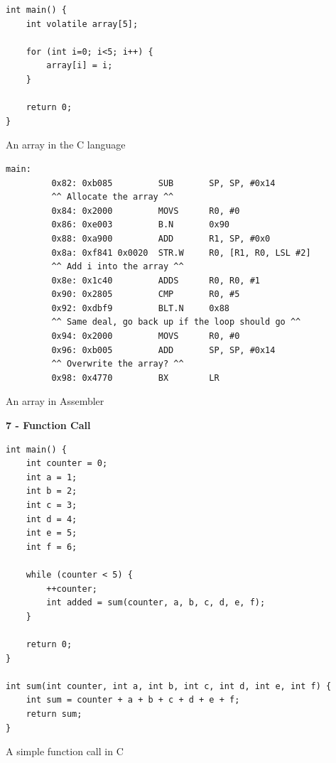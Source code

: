 \documentclass[12pt,a4paper]{report}
\begin{document}
\begin{normalsize}
\lstset{language=C}
\begin{lstlisting}
int main() {
    int volatile array[5];

    for (int i=0; i<5; i++) {
        array[i] = i;
    }

    return 0;
}
\end{lstlisting}	
\begin{center}
\small{An array in the C language}
\end{center}

\lstset{language=[x86masm]Assembler}
\begin{lstlisting}
main:
         0x82: 0xb085         SUB       SP, SP, #0x14
         ^^ Allocate the array ^^
         0x84: 0x2000         MOVS      R0, #0
         0x86: 0xe003         B.N       0x90
         0x88: 0xa900         ADD       R1, SP, #0x0
         0x8a: 0xf841 0x0020  STR.W     R0, [R1, R0, LSL #2]
         ^^ Add i into the array ^^
         0x8e: 0x1c40         ADDS      R0, R0, #1
         0x90: 0x2805         CMP       R0, #5
         0x92: 0xdbf9         BLT.N     0x88
         ^^ Same deal, go back up if the loop should go ^^
         0x94: 0x2000         MOVS      R0, #0
         0x96: 0xb005         ADD       SP, SP, #0x14
         ^^ Overwrite the array? ^^
         0x98: 0x4770         BX        LR
\end{lstlisting}	
\begin{center}
\small{An array in Assembler}
\end{center}


\textbf{7 - Function Call} \\

\lstset{language=C}
\begin{lstlisting}
int main() {
    int counter = 0;
    int a = 1;
    int b = 2;
    int c = 3;
    int d = 4;
    int e = 5;
    int f = 6;

    while (counter < 5) {
        ++counter;
        int added = sum(counter, a, b, c, d, e, f);
    }

    return 0;
}

int sum(int counter, int a, int b, int c, int d, int e, int f) {
    int sum = counter + a + b + c + d + e + f;
    return sum;
}
\end{lstlisting}	
\begin{center}
\small{A simple function call in C}
\end{center}


\end{normalsize}
\end{document}
